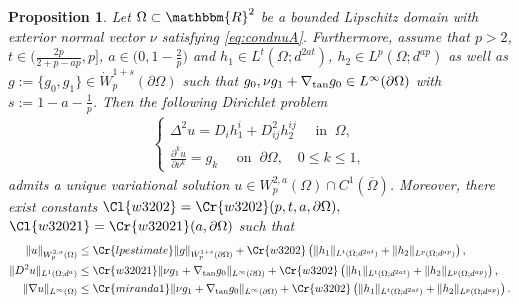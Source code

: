 \documentclass[12pt,a4paper,twoside]{article}
\newcommand{\R}{\mathbbm {R}}
\newtheorem{Proposition}[thm]{Proposition}
\begin{document}
\begin{Proposition}
 \label{weightschauderlpdiv}
Let $\Omega\subset \R^2$ be a bounded Lipschitz domain with exterior normal vector $\nu$ satisfying \eqref{eq:condnuA}. Furthermore, assume that 
$p>2$, $t\in \big(\frac{2p}{2+p-ap},p\big]$, $a\in \big(0, 1-\frac{2}{p}\big)$ and %
$    h_1\in L^{t}(\Omega ;d^{2at})$, $
  h_2 \in L^{p}(\Omega ;d^{ap})$ as well as $g:=\{g_0,g_1\}\in \dot W^{1+s}_p(\partial\Omega)$ such that $g_0, \nu g_1+\nabla_{\rm tan} g_0\in L^{\infty}(\partial\Omega)$ with $s:=1-a-\frac{1}{p}$. Then the following Dirichlet problem
\begin{align}
    \begin{cases}
   \Delta^2u =  D_ih^i_1+D^2_{ij}h^{ij}_2 \quad \text{ in } \ \Omega, \\
    \displaystyle\frac{\partial^k u}{\partial \nu^k} = g_k \quad \text{ on } \ \partial \Omega, \quad 0\le k\le 1,
    \end{cases} \label{eq:lpexistest} 
\end{align}
admits a unique variational solution $u\in W^{2,a}_p(\Omega)\cap C^1(\overline{\Omega})$. Moreover, there exist constants $\Cl{w3202}=\Cr{w3202}(p,t,a,\partial\Omega),$ $\Cl{w32021}=\Cr{w32021}(a,\partial\Omega)$ such that
\begin{align*}
    \|u\|_{W^{2,a}_p(\Omega)} &\le \Cr{lpestimate}
   \|  
    g  \|_{ \dot W^{1+s}_p (\partial\Omega)} 
     + 
        \Cr{w3202} \left(
    \|h_1\|_{L^{t}(\Omega ;d^{2at})}
   + \|h_2\|_{L^{p}(\Omega ;d^{ap})}
    \right)
    ,\\
         \|D^2u\|_{L^{1}(\Omega;d^a  )} &\le \Cr{w32021}
   \| \nu g_1
   +
   \nabla_{\rm tan} g_0\|_{L^\infty(\partial\Omega)}
     + 
        \Cr{w3202} \left(
    \|h_1\|_{L^{t}(\Omega ;d^{2at})}
   + \|h_2\|_{L^{p}(\Omega ;d^{ap})}
    \right),
    \\
            \|\nabla u\|_{L^\infty(\Omega)} &\le \Cr{miranda1}
   \| \nu g_1
   +
   \nabla_{\rm tan} g_0\|_{L^\infty(\partial\Omega)}
     + 
        \Cr{w3202} \left(
    \|h_1\|_{L^{t}(\Omega ;d^{2at})}
   + \|h_2\|_{L^{p}(\Omega ;d^{ap})}
    \right)
    .
\end{align*}
\end{Proposition}
\end{document}
